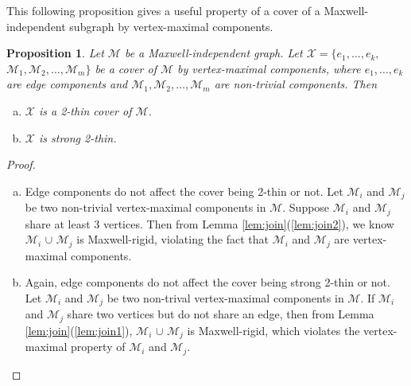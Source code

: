\documentclass[10pt]{article}
\def\M{\mathcal {M}}
\def\I{\mathcal {I}}
\def\A{\mathcal {A}}
\def\X{\mathcal {X}}
\newtheorem{obs}{Proposition}
\begin{document}
This following proposition gives a useful property of a cover of a Maxwell-independent subgraph by vertex-maximal components.
\begin{obs}\label{obs:vmmr}
Let $\M$ be a Maxwell-independent graph. Let $\X=\{e_1, \ldots, e_k,$ $\M_1, \M_2, \ldots, \M_m\}$ be a cover of $\M$ by vertex-maximal components, where $e_1, \ldots, e_k$ are edge components and $\M_1, \M_2, \ldots, \M_m$ are non-trivial components. Then
\begin{enumerate}[(a)]
\item\label{obs:vmmr1} $\X$ is a 2-thin cover of $\M$.
\item\label{obs:vmmr2} $\X$ is strong 2-thin.

\begin{comment}
\item\label{obs:vmmr3} Suppose $\X$ is the {\em complete} collection of vertex-maximal components of $\M$. Let $\I_{\M}$ be a maximal independent set of $\M$ and extend $\I_{\M}$ to a maximal independent set $\I$ of $G$. Let $\A = \I\setminus\I_{\M}$. Then for each edge $e=(u, v)$ in $\A$, there exists at least one non-trivial component $\M_i$ such that $u\in \M_i$ and $v\in \M_i$.
Denote by $\A_i$ the set of edges of $\A$ both of whose endpoints are in $\M_i$.
Then we have $$ \sum_{i=1}^m |\A_i| \geq |\A| = |\I\setminus\I_\M|$$
\end{comment}
\end{enumerate}
\end{obs}
\begin{proof}
\begin{enumerate}[(a)]
\item Edge components do not affect the cover being 2-thin or not. 
Let $\M_i$ and $\M_j$ be two non-trivial vertex-maximal components in $\M$. Suppose $\M_i$ and $\M_j$ share at least $3$ vertices. Then from Lemma \ref{lem:join}(\ref{lem:join2}), we know $\M_i$ $\cup$ $\M_j$ is Maxwell-rigid, violating the fact that $\M_i$ and $\M_j$ are vertex-maximal components.


\item  Again, edge components do not affect the cover being strong 2-thin or not. Let $\M_i$ and $\M_j$ be two non-trival vertex-maximal components in $\M$. If $\M_i$ and $\M_j$ share two vertices but do not share an edge, then from Lemma \ref{lem:join}(\ref{lem:join1}), $\M_i$ $\cup$ $\M_j$ is Maxwell-rigid, which violates the vertex-maximal property of $\M_i$ and $\M_j$.





\end{enumerate}
\end{proof}
\end{document}
